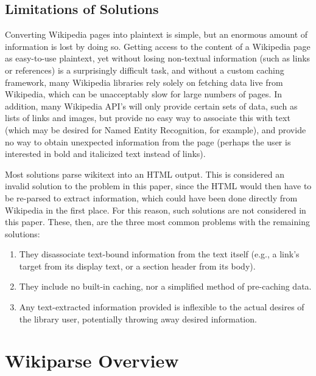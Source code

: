\subsection{Limitations of Solutions}

Converting Wikipedia pages into plaintext is simple, but an enormous amount of information is lost by doing so. Getting access to the content of a Wikipedia page as easy-to-use plaintext, yet without losing non-textual information (such as links or references) is a surprisingly difficult task, and without a custom caching framework, many Wikipedia libraries rely solely on fetching data live from Wikipedia, which can be unacceptably slow for large numbers of pages. In addition, many Wikipedia API's will only provide certain sets of data, such as lists of links and images, but provide no easy way to associate this with text (which may be desired for Named Entity Recognition, for example), and provide no way to obtain unexpected information from the page (perhaps the user is interested in bold and italicized text instead of links).

Most solutions parse wikitext into an HTML output. This is considered an invalid solution to the problem in this paper, since the HTML would then have to be re-parsed to extract information, which could have been done directly from Wikipedia in the first place. For this reason, such solutions are not considered in this paper. These, then, are the three most common problems with the remaining solutions:

\begin{enumerate}
\item They disassociate text-bound information from the text itself (e.g., a link's target from its display text, or a section header from its body).
\item They include no built-in caching, nor a simplified method of pre-caching data.
\item Any text-extracted information provided is inflexible to the actual desires of the library user, potentially throwing away desired information.
\end{enumerate}

\section{Wikiparse Overview}


